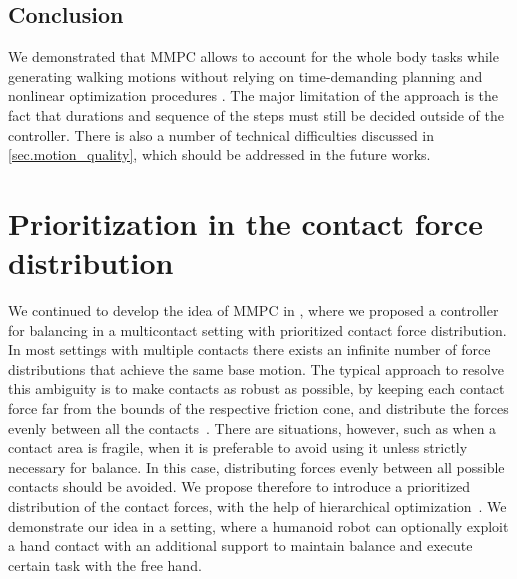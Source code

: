 \subsection{Conclusion}\label{sec.task_walk_conclusion}

We demonstrated that \ac{MMPC} allows to account for the whole body tasks while
generating walking motions without relying on time-demanding planning and
nonlinear optimization procedures \cite{Escande2009iros, Kanoun2010ijrr,
Tassa2014icra}. The major limitation of the approach is the fact that durations
and sequence of the steps must still be decided outside of the controller.
There is also a number of technical difficulties discussed in
\cref{sec.motion_quality}, which should be addressed in the future works.


\FloatBarrier



\section{Prioritization in the contact force distribution}\label{sec.optional_force}

We continued to develop the idea of \ac{MMPC} in \cite{Sherikov2015humanoids},
where we proposed a controller for balancing in a multicontact setting with
prioritized contact force distribution. In most settings with multiple contacts
there exists an infinite number of force distributions that achieve the same
base motion. The typical approach to resolve this ambiguity is to make contacts
as robust as possible, by keeping each contact force far from the bounds of the
respective friction cone, and distribute the forces evenly between all the
contacts~\cite{Saab2013tro, Ott2011humanoids, Herzog2015auro, Hyon2007tro}.
There are situations, however, such as when a contact area is fragile, when it
is preferable to avoid using it unless strictly necessary for balance. In this
case, distributing forces evenly between all possible contacts should be
avoided. We propose therefore to introduce a prioritized distribution of the
contact forces, with the help of hierarchical optimization~\cite{Saab2013tro,
Escande2014ijrr, Kanoun2011tro}. We demonstrate our idea in a setting, where a
humanoid robot can optionally exploit a hand contact with an additional support
to maintain balance and execute certain task with the free hand.



